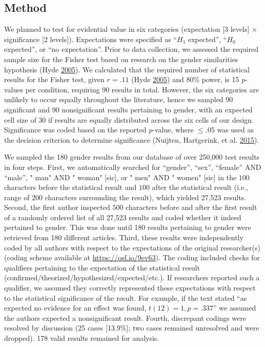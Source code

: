 \documentclass[a5paper]{book}
\begin{document}
\subsection{Method}\label{method-1}

We planned to test for evidential value in six categories (expectation
{[}3 levels{]} \(\times\) significance {[}2 levels{]}). Expectations
were specified as \enquote{\(H_1\) expected}, \enquote{\(H_0\)
expected}, or \enquote{no expectation}. Prior to data collection, we
assessed the required sample size for the Fisher test based on research
on the gender similarities hypothesis (Hyde
\protect\hyperlink{ref-doi:10.1037ux2f0003-066x.60.6.581}{2005}). We
calculated that the required number of statistical results for the
Fisher test, given \(r=.11\) (Hyde
\protect\hyperlink{ref-doi:10.1037ux2f0003-066x.60.6.581}{2005}) and
80\% power, is 15 \(p\)-values per condition, requiring 90 results in
total. However, the six categories are unlikely to occur equally
throughout the literature, hence we sampled 90 significant and 90
nonsignificant results pertaining to gender, with an expected cell size
of 30 if results are equally distributed across the six cells of our
design. Significance was coded based on the reported \(p\)-value, where
\(\leq.05\) was used as the decision criterion to determine significance
(Nuijten, Hartgerink, et al.
\protect\hyperlink{ref-doi:10.3758ux2fs13428-015-0664-2}{2015}).

We sampled the 180 gender results from our database of over 250,000 test
results in four steps. First, we automatically searched for
\enquote{gender}, \enquote{sex}, \enquote{female} AND \enquote{male}, "
man" AND " woman" {[}sic{]}, or " men" AND " women" {[}sic{]} in the
\(100\) characters before the statistical result and \(100\) after the
statistical result (i.e., range of \(200\) characters surrounding the
result), which yielded 27,523 results. Second, the first author
inspected \(500\) characters before and after the first result of a
randomly ordered list of all 27,523 results and coded whether it indeed
pertained to gender. This was done until 180 results pertaining to
gender were retrieved from 180 different articles. Third, these results
were independently coded by all authors with respect to the expectations
of the original researcher(s) (coding scheme available at
\url{https://osf.io/9ev63}). The coding included checks for qualifiers
pertaining to the expectation of the statistical result
(confirmed/theorized/hypothesized/expected/etc.). If researchers
reported such a qualifier, we assumed they correctly represented these
expectations with respect to the statistical significance of the result.
For example, if the text stated \enquote{as expected no evidence for an
effect was found, \(t(12)=1, p=.337\)} we assumed the authors expected a
nonsignificant result. Fourth, discrepant codings were resolved by
discussion (25 cases {[}13.9\%{]}; two cases remained unresolved and
were dropped). 178 valid results remained for analysis.
\end{document}
